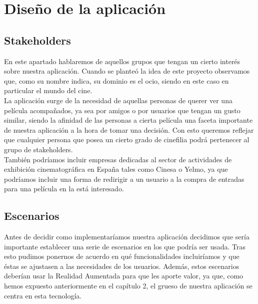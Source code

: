 
\cleardoublepage


\chapter{Diseño de la aplicación}
\label{makereference3}

\section{Stakeholders}
\label{makereference3.1}
En este apartado hablaremos de aquellos grupos que tengan un cierto interés sobre nuestra aplicación. Cuando se planteó
la idea de este proyecto observamos que, como su nombre indica, su dominio es el ocio, siendo en este caso en particular el mundo del cine.
\\
La aplicación surge de la necesidad de aquellas personas de querer ver una película acompañados, ya sea por amigos o por usuarios que tengan un gusto similar, 
siendo la afinidad de las personas a cierta película una faceta importante de nuestra aplicación a la hora de tomar una decisión. Con esto queremos reflejar que 
cualquier persona que posea un cierto grado de cinefilia podrá pertenecer al grupo de stakeholders.
\\
También podríamos incluir empresas dedicadas al sector de actividades de exhibición cinematográfica en España tales como Cinesa o Yelmo, ya que podríamos incluir 
una forma de redirigir a un usuario a la compra de entradas para una película en la está interesado.
\newpage 
\section{Escenarios}
\label{makereference3.2}
Antes de decidir como implementaríamos nuestra aplicación decidimos que sería importante establecer una serie
de escenarios en los que podría ser usada. Tras esto pudimos ponernos de acuerdo en qué funcionalidades incluiríamos y que 
éstas se ajustasen a las necesidades de los usuarios. Además, estos escenarios deberían usar la Realidad Aumentada para que 
les aporte valor, ya que, como hemos expuesto anteriormente en el capítulo 2, el grueso de nuestra aplicación se centra en esta tecnología.


